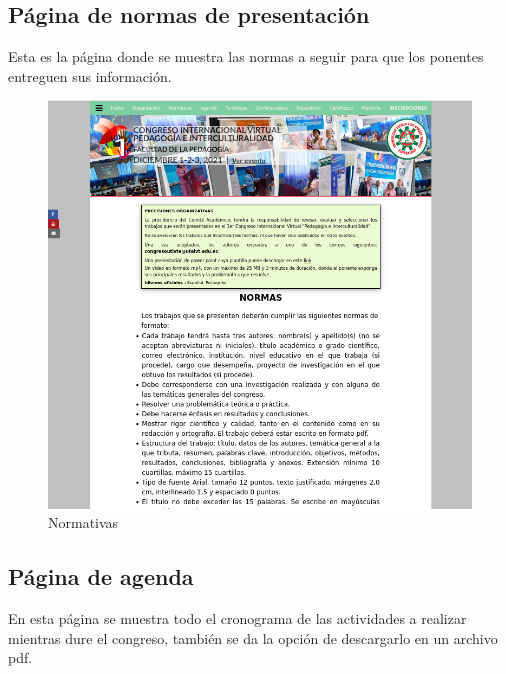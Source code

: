 \documentclass[a4paper,14px]{article}
\begin{document}
\newpage
\subsection{Página de normas de presentación }
\label{sec:pagina-principal}

Esta es la página  donde se muestra las normas a seguir para que los ponentes entreguen sus información.


\begin{minipage}[H]{0.45\linewidth}
  \begin{figure}[H]
    \centering
    \includegraphics[scale=0.6]{normativas.png}
    \caption{Normativas}
    \label{fig:arquitectura}
  \end{figure}

\end{minipage}
\newpage
\subsection{Página de agenda }
\label{sec:pagina-principal}

En esta página se muestra todo el cronograma de las actividades a realizar mientras dure el congreso, también se da la opción de descargarlo en un archivo pdf.
\end{document}
